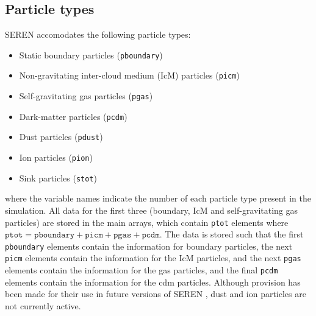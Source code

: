 \documentclass[a4paper]{article}
\newcommand{\NAME}{SEREN }
\newcommand{\var}[1]{\texttt{#1}}
\begin{document}
\subsection{Particle types}
\NAME accomodates the following particle types: 
\begin{itemize}
\item Static boundary particles (\var{pboundary})
\item Non-gravitating inter-cloud medium (IcM) particles (\var{picm})
\item Self-gravitating gas particles (\var{pgas})
\item Dark-matter particles (\var{pcdm})
\item Dust particles (\var{pdust})
\item Ion particles (\var{pion})
\item Sink particles (\var{stot})
\end{itemize}
where the variable names indicate the number of each particle type present 
in the simulation.  All data for the first three (boundary, IcM and self-gravitating gas particles) are stored in the main arrays, which contain \var{ptot} elements where $\var{ptot} = \var{pboundary} + \var{picm} + \var{pgas} + \var{pcdm}$.   
The data is stored such that the first \var{pboundary} elements contain the 
information for boundary particles, the next \var{picm} elements contain the 
information for the IcM particles, and the next \var{pgas} elements 
contain the information for the gas particles, and the final \var{pcdm} elements contain the information for the cdm particles.  Although provision has been made for their use in future versions of \NAME, dust and ion particles are not currently active.  
\end{document}
